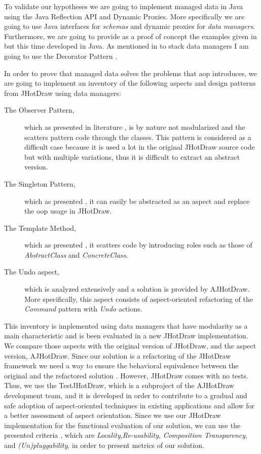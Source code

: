 To validate our hypotheses we are going to implement managed data in Java using the Java Reflection API and Dynamic Proxies. 
More specifically we are going to use Java interfaces for \textit{schemas} and dynamic proxies for \textit{data managers}. 
Furthermore, we are going to provide as a proof of concept the examples given in \cite{loh2012managed} but this time developed in Java. As mentioned in \cite{loh2012managed} to stack data managers I am going to use the Decorator Pattern \cite{gamma1995design}. 

In order to prove that managed data solves the problems that \ac{aop} introduces, we are going to implement an inventory of the following aspects and design patterns from JHotDraw using data managers:
\begin{description}
  \item[The Observer Pattern,] which as presented in literature \cite{tourwe2003existence} \cite{hannemann2005role} \cite{marin2005approach}, is by nature not modularized and the scatters pattern code through the classes. 
  This pattern is considered as a difficult case because it is used a lot in the original JHotDraw source code but with multiple variations, thus it is difficult to extract an abstract version.

  \item[The Singleton Pattern,] which as presented \cite{hannemann2005role} \cite{hannemann2002design}, it can easily be abstracted as an aspect and replace the \ac{oop} usage in JHotDraw. 

  \item[The Template Method,] which as presented \cite{hannemann2005role} \cite{hannemann2002design}, it scatters code by introducing roles such as those of \textit{AbstractClass} and \textit{ConcreteClass}.

  \item[The Undo aspect,] which is analyzed extensively \cite{marin2004refactoring} and a solution is provided by AJHotDraw. 
  More specifically, this aspect consists of aspect-oriented refactoring of the \textit{Command} pattern with \textit{Undo} actions.
\end{description}

This inventory is implemented using data managers that have modularity as a main characteristic and is been evaluated in a new JHotDraw implementation. 
We compare those aspects with the original version of JHotDraw, and the aspect version, AJHotDraw. 
Since our solution is a refactoring of the JHotDraw framework we need a way to ensure the behavioral equivalence between the original and the refactored solution \cite{fowler2009refactoring}. 
However, JHotDraw comes with no tests. 
Thus, we use the TestJHotDraw, which is a subproject of the AJHotDraw development team, and it is developed in order to contribute to a gradual and safe adoption of aspect-oriented techniques in existing applications and allow for a better assessment of aspect orientation.
Since we use our JHotDraw implementation for the functional evaluation of our solution, we can use the presented criteria \cite{hannemann2002design}, which are \textit{Locality},\textit{Re-usability}, \textit{Composition Transparency}, and \textit{(Un)pluggability}, in order to present metrics of our solution. 

